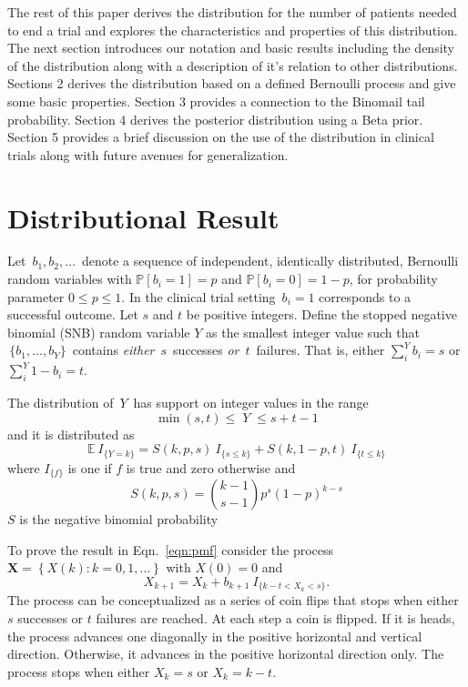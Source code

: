 \documentclass[review]{elsarticle}
\begin{document}
The rest of this paper derives the distribution for the number of
patients needed to end a trial and explores the characteristics and
properties of this distribution.
The next section introduces our notation and basic results
including the density of the distribution along with a description of
it's relation to other distributions. Sections 2 derives the distribution
based on a defined Bernoulli process and give some basic properties.
Section 3 provides a connection to the Binomail tail probability.
Section 4 derives the posterior distribution using a Beta prior.
Section 5 provides a brief discussion on the use of the distribution
in clinical trials along with future avenues for generalization.

\section{Distributional Result}
\label{notation.section}

Let $\,b_1, b_2, \ldots \,$ denote a sequence of independent, identically
distributed, Bernoulli random variables with $\mathbb{P}[b_i=1]=p$ and
$\mathbb{P}[b_i = 0] = 1-p$, for
probability parameter $0\leq p \leq 1$. In the clinical trial setting
$\,b_i = 1$ corresponds to a successful outcome.  Let $s$ and $t$ be
positive integers.  Define the stopped negative binomial (SNB) random
variable $Y$ as the smallest
integer value such that $\,\{b_1, \ldots , b_Y\}\,$ contains {\em either}
$\,s\,$ successes {\em or} $\,t\,$ failures. That is, either
$\sum_i^Y b_i = s$ or $\sum_i^Y 1-b_i = t$.

The distribution of $\,Y\,$ has support on integer values in the range
\begin{equation*}               
     \min(s,t) \leq \; Y \;\leq s+t-1  \label{range.y.eq}
\end{equation*}
and it is distributed as
\begin{equation} \label{eqn:pmf}
\mathbb{E}\  I_{\{Y=k\}} = S(k, p, s) \ I_{\{s \leq k\}} + 
  S(k, 1-p, t) \ I_{\{ t \leq k \}}
\end{equation}
where $I_{\{f\}}$ is one if $f$ is true and zero otherwise and
\begin{equation} \label{eqn:N}
S(k, p, s) = {k-1 \choose s-1} p^s (1-p)^{k-s} 
\end{equation}
$S$ is the negative binomial probability

To prove the result in Eqn.~\ref{eqn:pmf} consider the
process $\mathbf{X} = \left\{X(k) : k = 0,1,... \right\}$
with $X(0)=0$ and
\begin{equation*} \label{eqn:proc}
X_{k+1} = X_k + b_{k+1} \ I_{\{ k-t < X_k < s\}}.
\end{equation*}
The process can be conceptualized as a series of coin
flips that stops when either $s$ successes or $t$ failures are reached.
At each step a coin is flipped. If it is heads, the process advances
one diagonally in the
positive horizontal and vertical direction.
Otherwise, it advances in the positive horizontal direction only. The
process stops when either $X_k = s$ or $X_k = k-t$.
\end{document}
